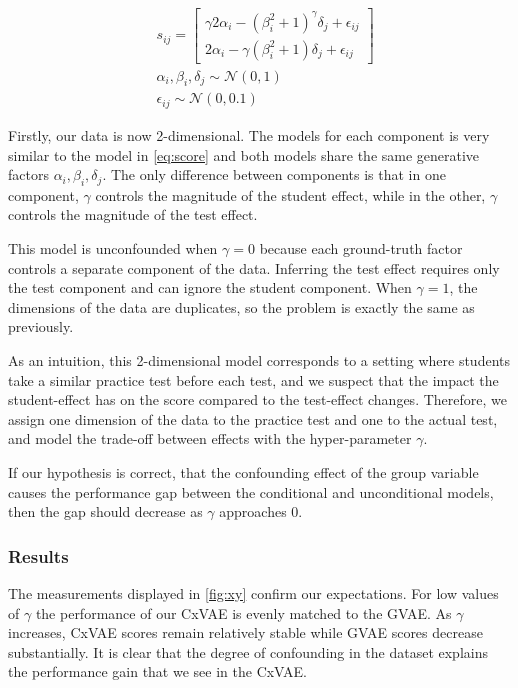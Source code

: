 \documentclass[nohyperref]{article}
\theoremstyle{plain}
\theoremstyle{definition}
\theoremstyle{remark}
\begin{document}
\begin{align}
& s_{ij} = \begin{bmatrix}
\gamma 2 \alpha_i - (\beta_i^2 + 1)^\gamma \delta_j + \epsilon_{ij}\\
2 \alpha_i - \gamma (\beta_i^2 + 1) \delta_j + \epsilon_{ij}
\end{bmatrix} \\
& \alpha_i, \beta_i, \delta_j \sim \mathcal{N} (0,1) \\
& \epsilon_{ij} \sim \mathcal{N} (0, 0.1)
\end{align}

Firstly, our data is now 2-dimensional. The models for each component is very similar to the model in \cref{eq:score} and both models share the same generative factors $\alpha_i, \beta_i, \delta_j$. The only difference between components is that in one component, $\gamma$ controls the magnitude of the student effect, while in the other, $\gamma$ controls the magnitude of the test effect.

This model is unconfounded when $\gamma=0$ because each ground-truth factor controls a separate component of the data. Inferring the test effect requires only the test component and can ignore the student component. When $\gamma=1$, the dimensions of the data are duplicates, so the problem is exactly the same as previously.

As an intuition, this 2-dimensional model corresponds to a setting where students take a similar practice test before each test, and we suspect that the impact the student-effect has on the score compared to the test-effect changes. Therefore, we assign one dimension of the data to the practice test and one to the actual test, and model the trade-off between effects with the hyper-parameter $\gamma$.

If our hypothesis is correct, that the confounding effect of the group variable causes the performance gap between the conditional and unconditional models, then the gap should decrease as $\gamma$ approaches 0.

\subsubsection{Results} 

The measurements displayed in \cref{fig:xy} confirm our expectations. For low values of $\gamma$ the performance of our CxVAE is evenly matched to the GVAE.  As $\gamma$ increases, CxVAE scores remain relatively stable while GVAE scores decrease substantially.  It is clear that the degree of confounding in the dataset explains the performance gain that we see in the CxVAE. 
\end{document}
